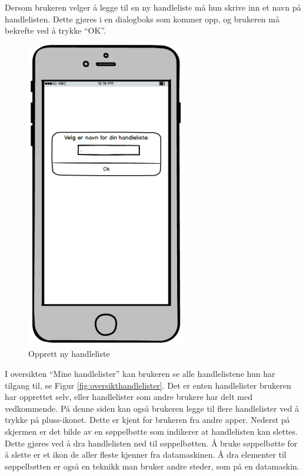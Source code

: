 \noindent Dersom brukeren velger å legge til en ny handleliste må hun skrive inn et navn på handlelisten. Dette gjøres i en dialogboks som kommer opp, og brukeren må bekrefte ved å trykke “OK”. 

\begin{figure}[H]
\includegraphics[scale=0.47]{images/prototype1/oppretthandleliste}
\centering %
\caption{Opprett ny handleliste}
\label{fig:oppretthandleliste}
\end{figure}

\noindent I oversikten “Mine handlelister” kan brukeren se alle handlelistene hun har tilgang til, se Figur \ref{fig:oversikthandlelister}. Det er enten handlelister brukeren har opprettet selv, eller handlelister som andre brukere har delt med vedkommende. På denne siden kan også brukeren legge til flere handlelister ved å trykke på pluss-ikonet. Dette er kjent for brukeren fra andre apper. Nederst på skjermen er det bilde av en søppelbøtte som indikerer at handlelisten kan slettes. Dette gjøres ved å dra handlelisten ned til søppelbøtten. Å bruke søppelbøtte for å slette er et ikon de aller fleste kjenner fra datamaskinen. Å dra elementer til søppelbøtten er også en teknikk man bruker andre steder, som på en datamaskin.

